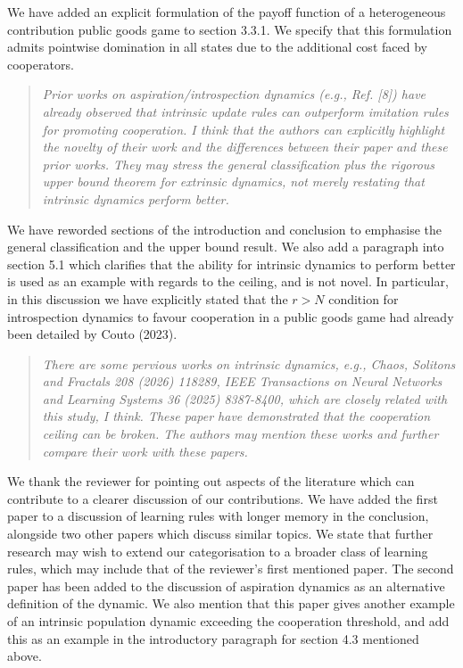 \documentclass[11pt]{article}
\newenvironment{reviewerquote}
  {\begin{quote}\itshape}
  {\end{quote}}
\begin{document}
We have added an explicit formulation of the payoff function of a
heterogeneous contribution public goods game to section 3.3.1. We specify that
this formulation admits pointwise domination in all states due to the additional
cost faced by cooperators. 

\begin{reviewerquote}
    Prior works on aspiration/introspection dynamics (e.g., Ref. [8]) have
    already observed that intrinsic update rules can outperform imitation rules
    for promoting cooperation. I think that the authors can explicitly highlight
    the novelty of their work and the differences between their paper and these
    prior works. They may stress the general classification plus the rigorous
    upper bound theorem for extrinsic dynamics, not merely restating that
    intrinsic dynamics perform better.
\end{reviewerquote}

We have reworded sections of the introduction and conclusion to emphasise the
general classification and the upper bound result. We also add a paragraph into
section 5.1 which clarifies that the ability for intrinsic dynamics to perform
better is used as an example with regards to the ceiling, and is not novel. In
particular, in this discussion we have explicitly stated that the \(r>N\)
condition for introspection dynamics to favour cooperation in a public goods
game had already been detailed by Couto (2023).


\begin{reviewerquote}
    There are some pervious works on intrinsic dynamics, e.g., Chaos, Solitons
    and Fractals 208 (2026) 118289, IEEE Transactions on Neural Networks and
    Learning Systems 36 (2025) 8387-8400, which are closely related with this
    study, I think. These paper have demonstrated that the cooperation ceiling
    can be broken. The authors may mention these works and further compare their
    work with these papers.
\end{reviewerquote}

We thank the reviewer for pointing out aspects of the literature which can
contribute to a clearer discussion of our contributions. We have added the first
paper to a discussion of learning rules with longer memory in the conclusion,
alongside two other papers which discuss similar topics. We state that further
research may wish to extend our categorisation to a broader class of learning
rules, which may include that of the reviewer's first mentioned paper. The
second paper has been added to the discussion of aspiration dynamics as an
alternative definition of the dynamic. We also mention that this paper gives
another example of an intrinsic population dynamic exceeding the cooperation
threshold, and add this as an example in the introductory paragraph for section
4.3 mentioned above.
\end{document}
